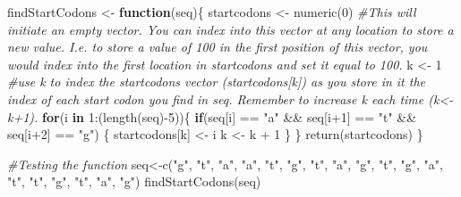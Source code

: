 \documentclass[
]{article}
\newenvironment{Shaded}{\begin{snugshade}}{\end{snugshade}}
\newcommand{\CommentTok}[1]{\textcolor[rgb]{0.56,0.35,0.01}{\textit{#1}}}
\newcommand{\ControlFlowTok}[1]{\textcolor[rgb]{0.13,0.29,0.53}{\textbf{#1}}}
\newcommand{\DecValTok}[1]{\textcolor[rgb]{0.00,0.00,0.81}{#1}}
\newcommand{\FunctionTok}[1]{\textcolor[rgb]{0.00,0.00,0.00}{#1}}
\newcommand{\NormalTok}[1]{#1}
\newcommand{\OtherTok}[1]{\textcolor[rgb]{0.56,0.35,0.01}{#1}}
\newcommand{\SpecialCharTok}[1]{\textcolor[rgb]{0.00,0.00,0.00}{#1}}
\newcommand{\StringTok}[1]{\textcolor[rgb]{0.31,0.60,0.02}{#1}}
\begin{document}
\begin{Shaded}
\begin{Highlighting}[]
\NormalTok{findStartCodons }\OtherTok{\textless{}{-}} \ControlFlowTok{function}\NormalTok{(seq)\{}
\NormalTok{  startcodons }\OtherTok{\textless{}{-}} \FunctionTok{numeric}\NormalTok{(}\DecValTok{0}\NormalTok{) }\CommentTok{\#This will initiate an empty vector. You can index into this vector at any location to store a new value. I.e. to store a value of 100 in the first position of this vector, you would index into the first location in \textasciigrave{}startcodons\textasciigrave{} and set it equal to 100.}
\NormalTok{  k }\OtherTok{\textless{}{-}} \DecValTok{1} \CommentTok{\#use k to index the \textquotesingle{}startcodons\textquotesingle{} vector (startcodons[k]) as you store in it the index of each start codon you find in \textquotesingle{}seq\textquotesingle{}. Remember to increase k each time (k\textless{}{-}k+1). }
  \ControlFlowTok{for}\NormalTok{(i }\ControlFlowTok{in} \DecValTok{1}\SpecialCharTok{:}\NormalTok{(}\FunctionTok{length}\NormalTok{(seq)}\SpecialCharTok{{-}}\DecValTok{5}\NormalTok{))\{}
    \ControlFlowTok{if}\NormalTok{(seq[i] }\SpecialCharTok{==} \StringTok{"a"} \SpecialCharTok{\&\&}\NormalTok{ seq[i}\SpecialCharTok{+}\DecValTok{1}\NormalTok{] }\SpecialCharTok{==} \StringTok{"t"} \SpecialCharTok{\&\&}\NormalTok{ seq[i}\SpecialCharTok{+}\DecValTok{2}\NormalTok{] }\SpecialCharTok{==} \StringTok{"g"}\NormalTok{) \{}
\NormalTok{      startcodons[k] }\OtherTok{\textless{}{-}}\NormalTok{ i}
\NormalTok{      k }\OtherTok{\textless{}{-}}\NormalTok{ k }\SpecialCharTok{+} \DecValTok{1}
\NormalTok{    \}}
\NormalTok{  \}}
  \FunctionTok{return}\NormalTok{(startcodons)}
\NormalTok{\}}

\CommentTok{\#Testing the function}
\NormalTok{seq}\OtherTok{\textless{}{-}}\FunctionTok{c}\NormalTok{(}\StringTok{"g"}\NormalTok{, }\StringTok{"t"}\NormalTok{, }\StringTok{"a"}\NormalTok{, }\StringTok{"a"}\NormalTok{, }\StringTok{"t"}\NormalTok{, }\StringTok{"g"}\NormalTok{, }\StringTok{"t"}\NormalTok{, }\StringTok{"a"}\NormalTok{, }\StringTok{"g"}\NormalTok{, }\StringTok{"t"}\NormalTok{, }\StringTok{"g"}\NormalTok{, }\StringTok{"a"}\NormalTok{, }\StringTok{"t"}\NormalTok{, }\StringTok{"t"}\NormalTok{, }\StringTok{"g"}\NormalTok{, }\StringTok{"t"}\NormalTok{, }\StringTok{"a"}\NormalTok{, }\StringTok{"g"}\NormalTok{)}
\FunctionTok{findStartCodons}\NormalTok{(seq)}
\end{Highlighting}
\end{Shaded}
\end{document}
